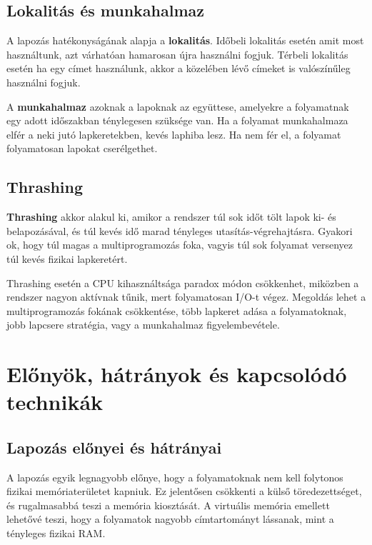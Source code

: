 \begin{center}

\end{center}

\subsection{Lokalitás és munkahalmaz}

A lapozás hatékonyságának alapja a \textbf{lokalitás}. Időbeli lokalitás esetén amit most használtunk, azt várhatóan hamarosan újra használni fogjuk. Térbeli lokalitás esetén ha egy címet használunk, akkor a közelében lévő címeket is valószínűleg használni fogjuk.

A \textbf{munkahalmaz} azoknak a lapoknak az együttese, amelyekre a folyamatnak egy adott időszakban ténylegesen szüksége van. Ha a folyamat munkahalmaza elfér a neki jutó lapkeretekben, kevés laphiba lesz. Ha nem fér el, a folyamat folyamatosan lapokat cserélgethet.

\subsection{Thrashing}

\textbf{Thrashing} akkor alakul ki, amikor a rendszer túl sok időt tölt lapok ki- és belapozásával, és túl kevés idő marad tényleges utasítás-végrehajtásra. Gyakori ok, hogy túl magas a multiprogramozás foka, vagyis túl sok folyamat versenyez túl kevés fizikai lapkeretért.

Thrashing esetén a CPU kihasználtsága paradox módon csökkenhet, miközben a rendszer nagyon aktívnak tűnik, mert folyamatosan I/O-t végez. Megoldás lehet a multiprogramozás fokának csökkentése, több lapkeret adása a folyamatoknak, jobb lapcsere stratégia, vagy a munkahalmaz figyelembevétele.

\section{Előnyök, hátrányok és kapcsolódó technikák}

\subsection{Lapozás előnyei és hátrányai}

A lapozás egyik legnagyobb előnye, hogy a folyamatoknak nem kell folytonos fizikai memóriaterületet kapniuk. Ez jelentősen csökkenti a külső töredezettséget, és rugalmasabbá teszi a memória kiosztását. A virtuális memória emellett lehetővé teszi, hogy a folyamatok nagyobb címtartományt lássanak, mint a tényleges fizikai RAM.


